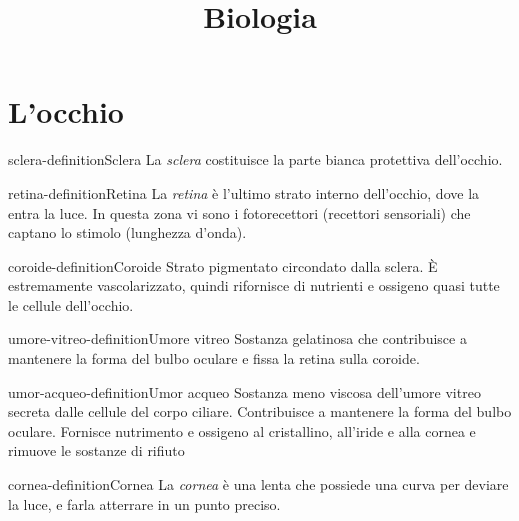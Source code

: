 \documentclass[preview]{standalone}
\begin{document}
\title{Biologia}
\genpage

\section{L'occhio}




\begin{snippetdefinition}{sclera-definition}{Sclera}
    La \textit{sclera} costituisce la parte bianca protettiva dell'occhio.
\end{snippetdefinition}

\begin{snippetdefinition}{retina-definition}{Retina}
    La \textit{retina} è l'ultimo strato interno dell'occhio, dove la entra la luce.
    In questa zona vi sono i fotorecettori (recettori sensoriali) che captano lo stimolo (lunghezza d'onda).
\end{snippetdefinition}

\begin{snippetdefinition}{coroide-definition}{Coroide}
    Strato pigmentato circondato dalla sclera. È estremamente vascolarizzato, quindi rifornisce
    di nutrienti e ossigeno quasi tutte le cellule dell'occhio.
\end{snippetdefinition}

\begin{snippetdefinition}{umore-vitreo-definition}{Umore vitreo}
    Sostanza gelatinosa che contribuisce a mantenere la forma del bulbo oculare e fissa la
    retina sulla coroide.
\end{snippetdefinition}

\begin{snippetdefinition}{umor-acqueo-definition}{Umor acqueo}
    Sostanza meno viscosa dell'umore vitreo secreta dalle cellule del corpo ciliare. Contribuisce
    a mantenere la forma del bulbo oculare. Fornisce nutrimento e ossigeno al cristallino,
    all'iride e alla cornea e rimuove le sostanze di rifiuto
\end{snippetdefinition}

\begin{snippetdefinition}{cornea-definition}{Cornea}
    La \textit{cornea} è una lenta che possiede una curva per deviare la luce, e farla atterrare in un punto preciso.
\end{snippetdefinition}
\end{document}
